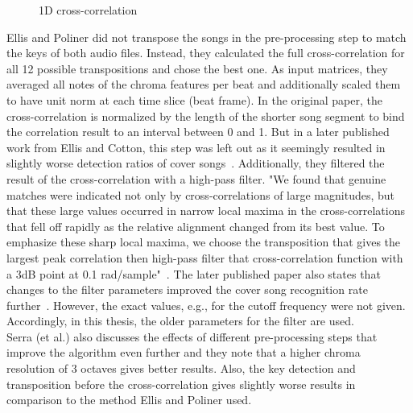 \begin{figure}[htbp]
	\centering
	\caption{1D cross-correlation}
	\label{fig:corr1}
\end{figure}
Ellis and Poliner did not transpose the songs in the pre-processing step to match the keys of both audio files. Instead, they calculated the full cross-correlation for all 12 possible transpositions and chose the best one. 
As input matrices, they averaged all notes of the chroma features per beat and additionally scaled them to have unit norm at each time slice (beat frame).
In the original paper, the cross-correlation is normalized by the length of the shorter song segment to bind the correlation result to an interval between 0 and 1. But in a later published work from Ellis and Cotton, this step was left out as it seemingly resulted in slightly worse detection ratios of cover songs~\cite{cover802}. 
Additionally, they filtered the result of the cross-correlation with a high-pass filter. "We found that genuine matches were indicated not only by cross-correlations of large magnitudes, but that these large values occurred in narrow local maxima in the cross-correlations that fell off rapidly as the relative alignment changed from its best value. To emphasize these sharp local maxima, we choose the transposition that gives the largest peak correlation then high-pass filter that cross-correlation function with a 3dB point at 0.1 rad/sample"~\cite[p. 3]{chroma3}. The later published paper also states that changes to the filter parameters improved the cover song recognition rate further~\cite{cover802}. However, the exact values, e.g., for the cutoff frequency were not given. Accordingly, in this thesis, the older parameters for the filter are used.\\
Serra (et al.) also discusses the effects of different pre-processing steps that improve the algorithm even further and they note that a higher chroma resolution of 3 octaves gives better results. Also, the key detection and transposition before the cross-correlation gives slightly worse results in comparison to the method Ellis and Poliner used.\\ 
